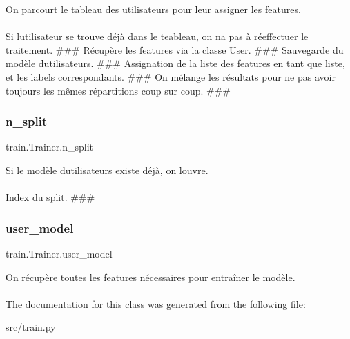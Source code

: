 On parcourt le tableau des utilisateurs pour leur assigner les features. 

\paragraph*{}

Si l\textquotesingle{}utilisateur se trouve déjà dans le teableau, on n\textquotesingle{}a pas à réeffectuer le traitement. \#\#\# Récupère les features via la classe User. \#\#\# Sauvegarde du modèle d\textquotesingle{}utilisateurs. \#\#\# Assignation de la liste des features en tant que liste, et les labels correspondants. \#\#\# On mélange les résultats pour ne pas avoir toujours les mêmes répartitions coup sur coup. \#\#\# \mbox{\label{classtrain_1_1_trainer_ac54aaf4028ad0a283506e27d2b7f8118}} 
\subsubsection{\texorpdfstring{n\+\_\+split}{n\_split}}
{\footnotesize\ttfamily train.\+Trainer.\+n\+\_\+split}



Si le modèle d\textquotesingle{}utilisateurs existe déjà, on l\textquotesingle{}ouvre. 

\paragraph*{}

Index du split. \#\#\# \mbox{\label{classtrain_1_1_trainer_adb7df426e58f065bdcdfd9289b5b779b}} 
\subsubsection{\texorpdfstring{user\+\_\+model}{user\_model}}
{\footnotesize\ttfamily train.\+Trainer.\+user\+\_\+model}



On récupère toutes les features nécessaires pour entraîner le modèle. 

\paragraph*{}

The documentation for this class was generated from the following file\+:\begin{DoxyCompactItemize}
\item 
src/train.\+py\end{DoxyCompactItemize}
